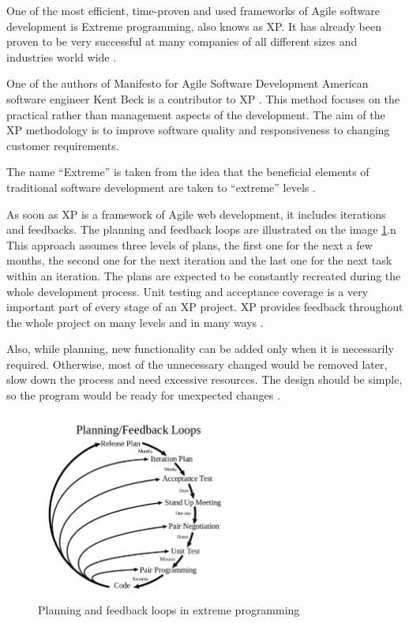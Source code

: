 One of the most efficient, time-proven and used frameworks of Agile software development is Extreme programming, also knows as XP. It has already been proven to be very successful at many companies of all different sizes and industries world wide \cite{xp_intro}.

One of the authors of Manifesto for Agile Software Development American software engineer Kent Beck is a contributor to XP \cite{xp_explained}. This method focuses on the practical rather than management aspects of the development. The aim of the XP methodology is to improve software quality and responsiveness to changing customer requirements.

The name ``Extreme'' is taken from the idea that the beneficial elements of traditional software development are taken to ``extreme'' levels \cite[Preface]{xp_explained}.

As soon as XP is a framework of Agile web development, it includes iterations and feedbacks. The planning and feedback loops are illustrated on the image \ref{fig:xp_loop}.n This approach assumes three levels of plans, the first one for the next a few months, the second one for the next iteration and the last one for the next task within an iteration. The plans are expected to be constantly recreated during the whole development process. Unit testing and acceptance coverage is a very important part of every stage of an XP project. XP provides feedback throughout the whole project on many levels and in many ways \cite[Planning/Feedback loops]{xp_intro}.

Also, while planning, new functionality can be added only when it is necessarily required. Otherwise, most of the unnecessary changed would be removed later, slow down the process and need excessive resources. The design should be simple, so the program would be ready for unexpected changes \cite{xp_early}.

\begin{figure}[h]
    \centerline{\includegraphics[width=0.6\textwidth]{images/xp_loop}}
    \caption{Planning and feedback loops in extreme programming}
    \label{fig:xp_loop}
\end{figure}


